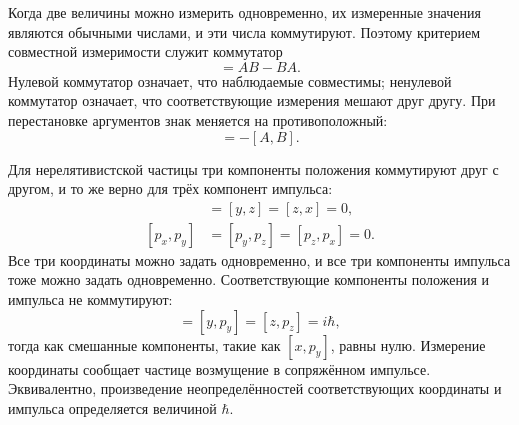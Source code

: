 Когда две величины можно измерить одновременно, их измеренные значения являются обычными числами, и эти числа коммутируют. Поэтому критерием совместной измеримости служит коммутатор
\begin{equation}
[A,B]=AB-BA.
\end{equation}
Нулевой коммутатор означает, что наблюдаемые совместимы; ненулевой коммутатор означает, что соответствующие измерения мешают друг другу. При перестановке аргументов знак меняется на противоположный:
\begin{equation}
[B,A]=-[A,B].
\end{equation}

Для нерелятивистской частицы три компоненты положения коммутируют друг с другом, и то же верно для трёх компонент импульса:
\begin{align}
[x,y]&=[y,z]=[z,x]=0,\\
[p_x,p_y]&=[p_y,p_z]=[p_z,p_x]=0.
\end{align}
Все три координаты можно задать одновременно, и все три компоненты импульса тоже можно задать одновременно. Соответствующие компоненты положения и импульса не коммутируют:
\begin{equation}
[x,p_x]=[y,p_y]=[z,p_z]=i\hbar,
\end{equation}
тогда как смешанные компоненты, такие как \([x,p_y]\), равны нулю. Измерение координаты сообщает частице возмущение в сопряжённом импульсе. Эквивалентно, произведение неопределённостей соответствующих координаты и импульса определяется величиной \(\hbar\).

\begin{classroomqa}
\end{classroomqa}

\begin{classroomqa}
\end{classroomqa}

